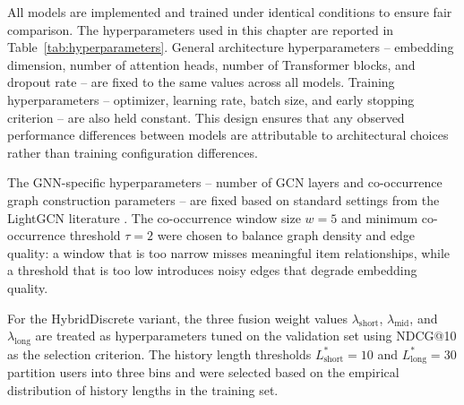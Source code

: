 \documentclass[12pt,a4paper]{report}
\begin{document}
\justifying
All models are implemented and trained under identical conditions to ensure
fair comparison. The hyperparameters used in this chapter are reported in
Table~\ref{tab:hyperparameters}. General architecture hyperparameters --
embedding dimension, number of attention heads, number of Transformer blocks,
and dropout rate -- are fixed to the same values across all models. Training
hyperparameters -- optimizer, learning rate, batch size, and early stopping
criterion -- are also held constant. This design ensures that any observed
performance differences between models are attributable to architectural
choices rather than training configuration differences.

The GNN-specific hyperparameters -- number of GCN layers and co-occurrence
graph construction parameters -- are fixed based on standard settings from
the LightGCN literature \citep{he2020lightgcn}. The co-occurrence window size
\(w = 5\) and minimum co-occurrence threshold \(\tau = 2\) were chosen to
balance graph density and edge quality: a window that is too narrow misses
meaningful item relationships, while a threshold that is too low introduces
noisy edges that degrade embedding quality.

For the HybridDiscrete variant, the three fusion weight values
\(\lambda_{\text{short}}\), \(\lambda_{\text{mid}}\), and \(\lambda_{\text{long}}\)
are treated as hyperparameters tuned on the validation set using
NDCG@10 as the selection criterion. The history length thresholds
\(L^*_{\text{short}} = 10\) and \(L^*_{\text{long}} = 30\) partition users
into three bins and were selected based on the empirical distribution of
history lengths in the training set.
\end{document}
